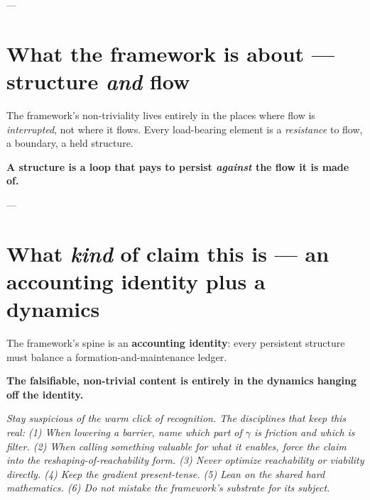 \documentclass{article}
\begin{document}
---
\section{What the framework is about --- structure \textit{and} flow}
The framework's non-triviality lives entirely in the places where flow is \textit{interrupted}, not where it flows. Every load-bearing element is a \textit{resistance} to flow, a boundary, a held structure.

\textbf{A structure is a loop that pays to persist \textit{against} the flow it is made of.}

---
\section{What \textit{kind} of claim this is --- an accounting identity plus a dynamics}
The framework's spine is an \textbf{accounting identity}: every persistent structure must balance a formation-and-maintenance ledger.

\textbf{The falsifiable, non-trivial content is entirely in the dynamics hanging off the identity.}

\hr

\textit{Stay suspicious of the warm click of recognition. The disciplines that keep this real: (1) When lowering a barrier, name which part of $\gamma$ is friction and which is filter. (2) When calling something valuable for what it enables, force the claim into the reshaping-of-reachability form. (3) Never optimize reachability or viability directly. (4) Keep the gradient present-tense. (5) Lean on the shared hard mathematics. (6) Do not mistake the framework's substrate for its subject.}
\end{document}
